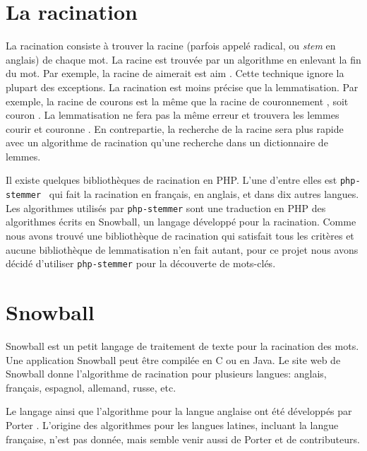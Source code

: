 \section{La racination}
La racination consiste \`a trouver la racine (parfois appel\'e radical, ou \emph{stem} en anglais) de chaque mot.
La racine est trouv\'ee par un algorithme en enlevant la fin du mot.
Par exemple, la racine de \og aimerait \fg{} est \og aim \fg{}.
Cette technique ignore la plupart des exceptions.
La racination est moins pr\'ecise que la lemmatisation.
Par exemple, la racine de \og courons \fg{} est la m\^eme que la racine de \og couronnement \fg{}, soit \og couron \fg{}.
La lemmatisation ne fera pas la m\^eme erreur et trouvera les lemmes \og courir \fg{} et \og couronne \fg{}.
En contrepartie, la recherche de la racine sera plus rapide avec un algorithme de racination qu'une recherche dans un dictionnaire de lemmes.

Il existe quelques biblioth\`eques de racination en PHP.
L'une d'entre elles est \texttt{php-stemmer}~\cite{phpstemmer} qui fait la racination en fran\c{c}ais, en anglais, et dans dix autres langues.
Les algorithmes utilis\'es par \texttt{php-stemmer} sont une traduction en PHP des algorithmes \'ecrits en Snowball, un langage d\'evelopp\'e pour la racination.
%
Comme nous avons trouv\'e une biblioth\`eque de racination qui satisfait tous les crit\`eres et aucune biblioth\`eque de lemmatisation n'en fait autant, pour ce projet nous avons d\'ecid\'e d'utiliser \texttt{php-stemmer} pour la d\'ecouverte de mots-cl\'es.

\section{Snowball}
Snowball est un petit langage de traitement de texte pour la racination des mots.
Une application Snowball peut \^etre compil\'ee en C ou en Java.
Le site web de Snowball donne l'algorithme de racination pour plusieurs langues: anglais, fran\c{c}ais, espagnol, allemand, russe, etc.

Le langage ainsi que l'algorithme pour la langue anglaise ont \'et\'e d\'evelopp\'es par Porter \cite{snowball}.
%
L'origine des algorithmes pour les langues latines, incluant la langue fran\c{c}aise, n'est pas donn\'ee, mais semble venir aussi de Porter et de contributeurs.

